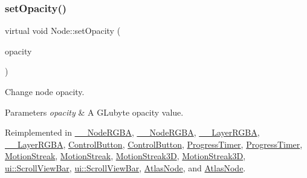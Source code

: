 \subsubsection{\texorpdfstring{set\+Opacity()}{setOpacity()}\hspace{0.1cm}{\footnotesize\ttfamily [2/2]}}
{\footnotesize\ttfamily virtual void Node\+::set\+Opacity (\begin{DoxyParamCaption}\item[{G\+Lubyte}]{opacity }\end{DoxyParamCaption})\hspace{0.3cm}{\ttfamily [virtual]}}

Change node opacity. 
\begin{DoxyParams}{Parameters}
{\em opacity} & A G\+Lubyte opacity value. \\
\hline
\end{DoxyParams}


Reimplemented in \hyperlink{class____NodeRGBA_aa0ac4f9dca25f519f175e668ba4f3306}{\+\_\+\+\_\+\+Node\+R\+G\+BA}, \hyperlink{class____NodeRGBA_aa0ac4f9dca25f519f175e668ba4f3306}{\+\_\+\+\_\+\+Node\+R\+G\+BA}, \hyperlink{class____LayerRGBA_a1b172623ee7486835fd189672d19d8d7}{\+\_\+\+\_\+\+Layer\+R\+G\+BA}, \hyperlink{class____LayerRGBA_a1b172623ee7486835fd189672d19d8d7}{\+\_\+\+\_\+\+Layer\+R\+G\+BA}, \hyperlink{classControlButton_adfe6c80adc5ba24d50d21f5ff742f6a1}{Control\+Button}, \hyperlink{classControlButton_aa6076ef32569a9be5361f12bf00d4aa1}{Control\+Button}, \hyperlink{classProgressTimer_a757eb314cc8f4633c6e5e240b2e6a4e8}{Progress\+Timer}, \hyperlink{classProgressTimer_a9f36a7fde3a6490b81e53f23ebbd3df9}{Progress\+Timer}, \hyperlink{classMotionStreak_af5d9d6c438239621c6931d312a92fcec}{Motion\+Streak}, \hyperlink{classMotionStreak_a7240b2a7e1340cf0139774421b7ca80e}{Motion\+Streak}, \hyperlink{classMotionStreak3D_aaf983644b09cefdf815a650c7cfd426a}{Motion\+Streak3D}, \hyperlink{classMotionStreak3D_aebd12e84f982bb11ab3cc3c92e769f73}{Motion\+Streak3D}, \hyperlink{classui_1_1ScrollViewBar_a89da6d683d0157d90c93b559e90c69e3}{ui\+::\+Scroll\+View\+Bar}, \hyperlink{classui_1_1ScrollViewBar_a89da6d683d0157d90c93b559e90c69e3}{ui\+::\+Scroll\+View\+Bar}, \hyperlink{classAtlasNode_af95a54e5d5157983414cad3d837853eb}{Atlas\+Node}, and \hyperlink{classAtlasNode_a396e36e894a70722806e90c7101207bc}{Atlas\+Node}.

\mbox{\label{classNode_a978c5435ab23f76e9efdf0f7e9e288e5}} 
